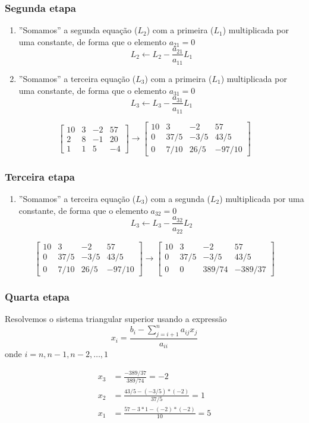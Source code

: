 \begin{frame}
\frametitle{Segunda etapa}

\begin{enumerate}
\item ''Somamos'' a segunda equação (\(L_2\)) com a primeira (\(L_1\)) multiplicada por uma constante, de forma que o elemento \(a_{21} = 0\)
\[
L_2 \leftarrow L_2 - \frac{a_{21}}{a_{11}} L_1
\] 
\item ''Somamos'' a terceira equação (\(L_3\)) com a primeira (\(L_1\)) multiplicada por uma constante, de forma que o elemento \(a_{31} = 0\)
\[
L_3 \leftarrow L_3 - \frac{a_{31}}{a_{11}} L_1
\] 
\end{enumerate}
\[
\left[
\begin{array}{ccc|c}
10 & 3 & -2 & 57 \\ 2 & 8 & -1 & 20 \\ 1 & 1 & 5 & -4
\end{array}
\right]
\rightarrow
\left[
\begin{array}{ccc|c}
10 & 3 & -2 & 57 \\ 0 & 37/5 & -3/5 & 43/5 \\ 0 & 7/10 & 26/5 & -97/10
\end{array}
\right]
\]
\end{frame}

\begin{frame}
\frametitle{Terceira etapa}
\begin{enumerate}
\item ''Somamos'' a terceira equação (\(L_3\)) com a segunda (\(L_2\)) multiplicada por uma constante, de forma que o elemento \(a_{32} = 0\)
\[
L_3 \leftarrow L_3 - \frac{a_{32}}{a_{22}} L_2
\] 
\end{enumerate}
\[
\left[
\begin{array}{ccc|c}
10 & 3 & -2 & 57 \\ 0 & 37/5 & -3/5 & 43/5 \\ 0 & 7/10 & 26/5 & -97/10
\end{array}
\right]
\rightarrow
\left[
\begin{array}{ccc|c}
10 & 3 & -2 & 57 \\ 0 & 37/5 & -3/5 & 43/5 \\ 0 & 0 & 389/74 & -389/37
\end{array}
\right]
\]
\end{frame}

\begin{frame}
\frametitle{Quarta etapa}
Resolvemos o sistema triangular superior usando a expressão
\[
x_i = \frac{b_i - \sum_{j=i+1}^{n} {a_{ij} x_j}}{a_{ii}}
\]
onde \(i = n, n-1, n-2, \ldots , 1\)

\begin{align*}
x_3 &= \frac{-389/37}{389/74}=-2 \\
x_2 & =\frac{43/5 - (-3/5)*(-2)}{37/5}=1 \\
x_1 &= \frac{57-3*1-(-2)*(-2)}{10} = 5
\end{align*}

\end{frame}
